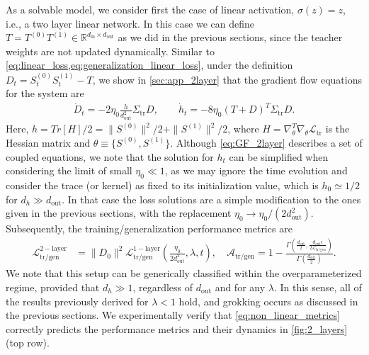 \documentclass[a4paper,11pt]{article}
\newcommand{\gradtheta}{\nabla_{\theta}}
\newcommand{\dout}{d_\mathrm{out}}
\newcommand{\din}{d_\mathrm{in}}
\newcommand{\training}{\mathrm{tr}}
\begin{document}
As a solvable model, we consider first the case of linear activation, $\sigma(z)=z$, i.e., a two layer linear network. In this case we can define $T= T^{(0)} T^{(1)}  \in \mathbb{R}^{ \din \times \dout }$ as we did in the previous sections, since the teacher weights are not updated dynamically.
%
Similar to \cref{eq:linear_loss,eq:generalization_linear_loss}, under the definition $D_t= S_t^{(0)} S_t^{(1)} - T$, we show in \cref{sec:app_2layer} that the gradient flow equations for the system are
\begin{align}
\label{eq:GF_2layer}
    \dot{D}_t
    =
    -
    2\eta_0 \frac{h}{d_\mathrm{out}^2}  \Sigma_\training  D 
    ,
    \qquad
    \dot{h}_t
    =
    -8\eta_0 (T+D)^T \Sigma_\training D.
\end{align}
Here, $h=Tr[H]/2=\|S^{(0)}\|^2/2 + \|S^{(1)}\|^2/2$, where $H=\gradtheta^T \gradtheta \mathcal{L}_\training$ is the Hessian matrix and $\theta\equiv\{S^{(0)},S^{(1)}\}$.
Although \cref{eq:GF_2layer} describes a set of coupled equations, we note that the solution for $h_t$ can be simplified when considering the limit of small $\eta_0 \ll1$, as we may ignore the time evolution and consider the trace (or kernel) as fixed to its initialization value, which is $h_0\simeq 1/2$ for $d_h \gg d_\mathrm{out}$. In that case the loss solutions are a simple modification to the ones given in the previous sections, with the replacement $\eta_0 \to \eta_0 /(2 d_\mathrm{out}^2)$.
Subsequently, the training/generalization performance metrics are 
\begin{align}
\label{eq:non_linear_metrics}
  \mathcal{L}_\mathrm{\training/gen}^\mathrm{2-layer} 
  &= 
  \|D_0 \|^2
  \mathcal{L}_\mathrm{\training/gen}^\mathrm{1-layer}
  \left(
  \frac{\eta_0 }{2 \dout^2}, \lambda, t
  \right),
  \quad
    \mathcal{A}_\mathrm{\training/gen} = 
  1-\frac{\Gamma \left(\frac{\dout}{2},\frac{\dout \epsilon }{2 \mathcal{L}_\mathrm{\training/gen}}\right)}{\Gamma \left(\frac{\dout}{2}\right)} .
\end{align}
We note that this setup can be generically classified within the overparameterized regime, provided that $d_h \gg 1$, regardless of $\dout$ and for any $\lambda$. In this sense, all of the results previously derived for $\lambda<1$ hold, and grokking occurs as discussed in the previous sections. We experimentally verify that \cref{eq:non_linear_metrics} correctly predicts the performance metrics and their dynamics in \cref{fig:2_layers} (top row).
\end{document}

